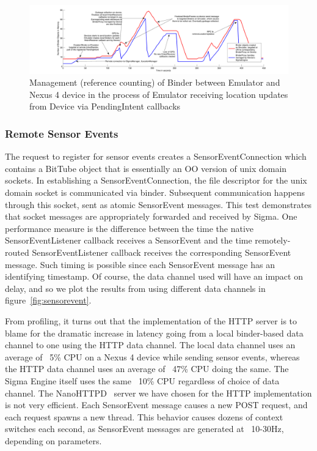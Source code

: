 \documentclass[prodmode]{acmlarge}
\begin{document}
\begin{figure}[h]
\centering
\includegraphics[width=\textwidth]{plots/location_sharing_reference_counting.pdf}
\caption{Management (reference counting) of Binder between Emulator and Nexus 4 device in the process of Emulator receiving location updates from Device via PendingIntent callbacks}
\label{fig:reference_counting}
\end{figure}

\subsubsection{Remote Sensor Events}
\label{sec:sensorevent}
The request to register for sensor events creates a SensorEventConnection which contains a BitTube object that is essentially an OO version of unix domain sockets. In establishing a SensorEventConnection, the file descriptor for the unix domain socket is communicated via binder. Subsequent communication happens through this socket, sent as atomic SensorEvent messages. This test demonstrates that socket messages are appropriately forwarded and received by Sigma. One performance measure is the difference between the time the native SensorEventListener callback receives a SensorEvent and the time remotely-routed SensorEventListener callback receives the corresponding SensorEvent message. Such timing is possible since each SensorEvent message has an identifying timestamp. Of course, the data channel used will have an impact on delay, and so we plot the results from using different data channels in figure~\ref{fig:sensorevent}.

From profiling, it turns out that the implementation of the HTTP server is to blame for the dramatic increase in latency going from a local binder-based data channel to one using the HTTP data channel. The local data channel uses an average of ~5\% CPU on a Nexus 4 device while sending sensor events, whereas the HTTP data channel uses an average of ~47\% CPU doing the same. The Sigma Engine itself uses the same ~10\% CPU regardless of choice of data channel. The NanoHTTPD~\cite{NanoHttpd} server we have chosen for the HTTP implementation is not very efficient. Each SensorEvent message causes a new POST request, and each request spawns a new thread. This behavior causes dozens of context switches each second, as SensorEvent messages are generated at ~10-30Hz, depending on parameters.
\end{document}
